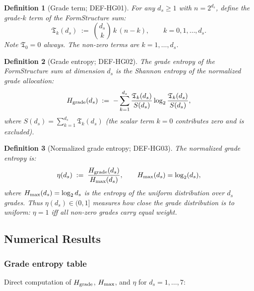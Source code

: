 \documentclass[12pt, a4paper]{article}
\newtheorem{definition}{Definition}[section]
\begin{document}
\begin{definition}[Grade term; DEF-HG01]
For any $d_s \geq 1$ with $n = 2^{d_s}$, define the
\emph{grade-$k$ term} of the FormStructure sum:
\begin{equation}
  \mathfrak{T}_k(d_s) \;:=\; \binom{d_s}{k}\, k\, (n - k),
  \qquad k = 0, 1, \ldots, d_s.
  \label{eq:Tk-def}
\end{equation}
Note $\mathfrak{T}_0 = 0$ always. The non-zero terms are
$k = 1, \ldots, d_s$.
\end{definition}

\begin{definition}[Grade entropy; DEF-HG02]
The \emph{grade entropy} of the FormStructure sum at dimension
$d_s$ is the Shannon entropy of the normalized grade allocation:
\begin{equation}
  H_{\rm grade}(d_s) \;:=\;
  -\sum_{k=1}^{d_s}
  \frac{\mathfrak{T}_k(d_s)}{S(d_s)}
  \log_2 \frac{\mathfrak{T}_k(d_s)}{S(d_s)},
  \label{eq:Hgrade-def}
\end{equation}
where $S(d_s) = \sum_{k=1}^{d_s} \mathfrak{T}_k(d_s)$
(the scalar term $k=0$ contributes zero and is excluded).
\end{definition}

\begin{definition}[Normalized grade entropy; DEF-HG03]
The \emph{normalized grade entropy} is:
\begin{equation}
  \eta(d_s) \;:=\;
  \frac{H_{\rm grade}(d_s)}{H_{\rm max}(d_s)},
  \qquad
  H_{\rm max}(d_s) = \log_2(d_s),
  \label{eq:eta-def}
\end{equation}
where $H_{\rm max}(d_s) = \log_2 d_s$ is the entropy of the
uniform distribution over $d_s$ grades. Thus $\eta(d_s) \in
(0, 1]$ measures how close the grade distribution is to uniform:
$\eta = 1$ iff all non-zero grades carry equal weight.
\end{definition}

\subsection{Numerical Results}
\label{sec:numerical}

\subsubsection{Grade entropy table}

Direct computation of $H_{\rm grade}$, $H_{\rm max}$, and $\eta$
for $d_s = 1, \ldots, 7$:
\end{document}
